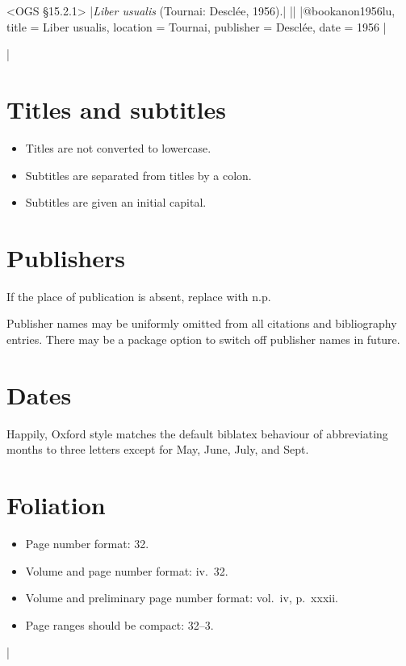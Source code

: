 \documentclass[extrafontsizes,11pt,a4paper,oneside]{memoir}
\begin{document}
\bibexample<OGS \S15.2.1>
|\emph{Liber usualis} (Tournai: Desclée, 1956).|%
||%
|@book{anon1956lu,
  title = {Liber usualis},
  location = {Tournai},
  publisher = {Desclée},
  date = {1956}
}|

\todoc|

\section{Titles and subtitles}

\begin{itemize}
  \item
  Titles are not converted to lowercase.
  
  \item
  Subtitles are separated from titles by a colon.
  
  \item
  Subtitles are given an initial capital.
  \par{}
\end{itemize}

\section{Publishers}

If the place of publication is absent, replace with n.p.

Publisher names may be uniformly omitted from all citations and bibliography entries.
There may be a package option to switch off publisher names in future.

\section{Dates}

Happily, Oxford style matches the default \textsf{biblatex} behaviour of
abbreviating months to three letters except for May, June, July, and Sept.

\section{Foliation}

\begin{itemize}
  \item Page number format: 32.
  \item Volume and page number format: iv.\ 32.
  \item Volume and preliminary page number format: vol.\ iv, p.\ xxxii.
  \item Page ranges should be compact: 32--3.\\
\end{itemize}
|
\end{document}
